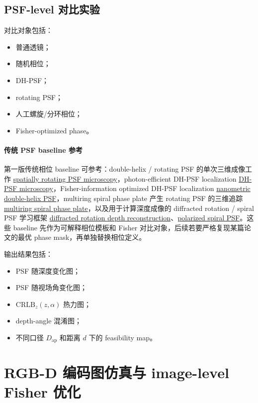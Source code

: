 \documentclass[11pt,a4paper,fontset=none]{ctexart}
\begin{document}
\subsection{PSF-level 对比实验}

对比对象包括：
\begin{itemize}
  \item 普通透镜；
  \item 随机相位；
  \item DH-PSF；
  \item rotating PSF；
  \item 人工螺旋/分环相位；
  \item Fisher-optimized phase。
\end{itemize}

\paragraph{传统 PSF baseline 参考}
第一版传统相位 baseline 可参考：double-helix / rotating PSF 的单次三维成像工作 \href{https://pmc.ncbi.nlm.nih.gov/articles/PMC5745098/}{spatially rotating PSF microscopy}，photon-efficient DH-PSF localization \href{https://pmc.ncbi.nlm.nih.gov/articles/PMC3207371/}{DH-PSF microscopy}，Fisher-information optimized DH-PSF localization \href{https://pmc.ncbi.nlm.nih.gov/articles/PMC3971058/}{nanometric double-helix PSF}，multiring spiral phase plate 产生 rotating PSF 的三维追踪 \href{https://pmc.ncbi.nlm.nih.gov/articles/PMC9799159/}{multiring spiral phase plate}，以及用于计算深度成像的 diffracted rotation / spiral PSF 学习框架 \href{https://arxiv.org/abs/2204.07076}{diffracted rotation depth reconstruction}、\href{https://arxiv.org/abs/2207.00945}{polarized spiral PSF}。这些 baseline 先作为可解释相位模板和 Fisher 对比对象，后续若要严格复现某篇论文的最优 phase mask，再单独替换相位定义。

输出结果包括：
\begin{itemize}
  \item PSF 随深度变化图；
  \item PSF 随视场角变化图；
  \item $\mathrm{CRLB}_z(z,\alpha)$ 热力图；
  \item depth-angle 混淆图；
  \item 不同口径 $D_{\mathrm{ap}}$ 和距离 $d$ 下的 feasibility map。
\end{itemize}

\section{RGB-D 编码图仿真与 image-level Fisher 优化}
\end{document}
